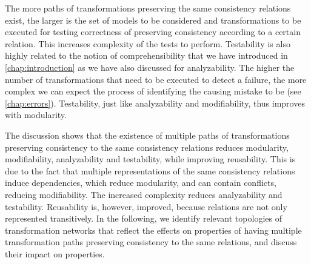 \begin{properdescription}
    The more paths of transformations preserving the same consistency relations exist, the larger is the set of models to be considered and transformations to be executed for testing correctness of preserving consistency according to a certain relation.
    This increases complexity of the tests to perform.
    Testability is also highly related to the notion of comprehensibility that we have introduced in \autoref{chap:introduction} as we have also discussed for analyzability. 
    The higher the number of transformations that need to be executed to detect a failure, the more complex we can expect the process of identifying the causing mistake to be (see \autoref{chap:errors}).
    Testability, just like analyzability and modifiability, thus improves with modularity.
\end{properdescription}

The discussion shows that the existence of multiple paths of transformations preserving consistency to the same consistency relations reduces modularity, modifiability, analyzability and testability, while improving reusability.
This is due to the fact that multiple representations of the same consistency relations induce dependencies, which reduce modularity, and can contain conflicts, reducing modifiability.
The increased complexity reduces analyzability and testability.
Reusability is, however, improved, because relations are not only represented transitively.
In the following, we identify relevant topologies of transformation networks that reflect the effects on properties of having multiple transformation paths preserving consistency to the same relations, and discuss their impact on properties.






